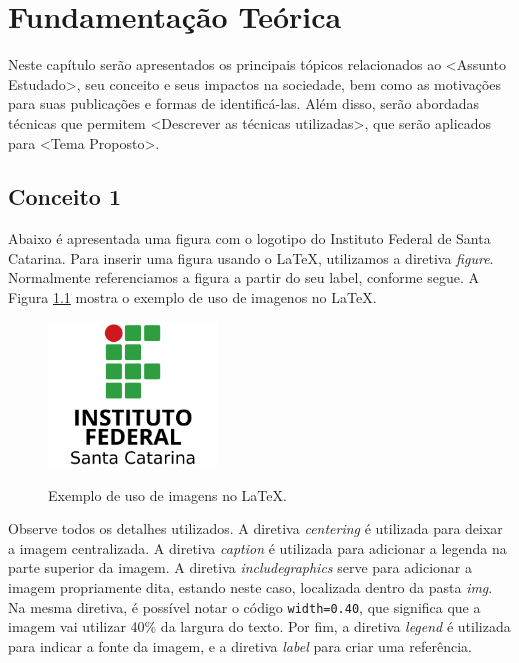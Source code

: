 \chapter{Fundamentação Teórica}
\label{chap:fund}

Neste capítulo serão apresentados os principais tópicos relacionados ao <Assunto Estudado>, seu conceito e seus impactos na sociedade, bem como as motivações para suas publicações e formas de identificá-las. Além disso, serão abordadas técnicas que permitem <Descrever as técnicas utilizadas>, que serão aplicados para <Tema Proposto>. 

\section{Conceito 1}
\label{sec:conceito1}

Abaixo é apresentada uma figura com o logotipo do Instituto Federal de Santa Catarina. Para inserir uma figura usando o LaTeX, utilizamos a diretiva \emph{figure}. Normalmente referenciamos a figura a partir do seu label, conforme segue. A Figura \ref{fig:exemplo1} mostra o exemplo de uso de imagenos no \LaTeX.

\begin{figure}[!htb]
    \centering
    \caption{Exemplo de uso de imagens no \LaTeX.}
    \includegraphics[width=0.40\textwidth]{img/ifsc.png}
    \label{fig:exemplo1}
 \end{figure}
 
 Observe todos os detalhes utilizados. A diretiva \emph{centering} é utilizada para deixar a imagem centralizada. A diretiva \emph{caption} é utilizada para adicionar a legenda na parte superior da imagem. A diretiva \emph{includegraphics} serve para adicionar a imagem propriamente dita, estando neste caso, localizada dentro da pasta \emph{img}. Na mesma diretiva, é possível notar o código \texttt{width=0.40}, que significa que a imagem vai utilizar 40\% da largura do texto. Por fim, a diretiva \emph{legend} é utilizada para indicar a fonte da imagem, e a diretiva \emph{label} para criar uma referência.

